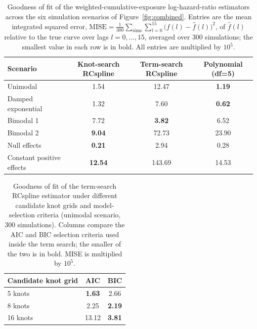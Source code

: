 \documentclass{article}
\begin{document}
\begin{table}[!ht]
\centering
\caption{Goodness of fit of the weighted-cumulative-exposure log-hazard-ratio
  estimators across the six simulation scenarios of Figure~\ref{fig:combined}.
  Entries are the mean integrated squared error,
  $\mathrm{MISE}=\frac{1}{300}\sum_{\text{sims}}\sum_{l=0}^{15}\bigl(f(l)-\hat f(l)\bigr)^2$,
  of $\hat f(l)$ relative to the true curve over lags $l=0,\dots,15$, averaged
  over 300 simulations; the smallest value in each row is in bold. All entries
  are multiplied by $10^{5}$.}
\label{tab:fit-metrics}
\begin{tabular}{l c c c}
\toprule
Scenario & Knot-search RCspline & Term-search RCspline & Polynomial (df=5)\\
\midrule
Unimodal & 1.54 & 12.47 & \textbf{1.19}\\
Damped exponential & 1.32 & 7.60 & \textbf{0.62}\\
Bimodal 1 & 7.72 & \textbf{3.82} & 6.52\\
Bimodal 2 & \textbf{9.04} & 72.73 & 23.90\\
Null effects & \textbf{0.21} & 2.94 & 0.28\\
Constant positive effects & \textbf{12.54} & 143.69 & 14.53\\
\bottomrule
\end{tabular}
\end{table}

\begin{table}[!ht]
\centering
\caption{Goodness of fit of the term-search RCspline estimator under different
  candidate knot grids and model-selection criteria (unimodal scenario, 300
  simulations). Columns compare the AIC and BIC selection criteria used inside
  the term search; the smaller of the two is in bold. MISE is multiplied by $10^{5}$.}
\label{tab:fit-tune}
\begin{tabular}{l c c}
\toprule
Candidate knot grid & AIC & BIC\\
\midrule
5 knots & \textbf{1.63} & 2.66\\
8 knots & 2.25 & \textbf{2.19}\\
16 knots & 13.12 & \textbf{3.81}\\
\bottomrule
\end{tabular}
\end{table}
\end{document}
